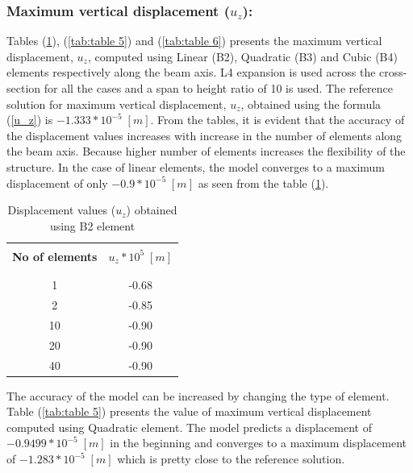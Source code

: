 \documentclass[a4paper,12pt]{article}
\begin{document}
\subsubsection*{Maximum vertical displacement ($u_{z}$):}
Tables (\ref{tab:table 4}), (\ref{tab:table 5}) and (\ref{tab:table 6}) presents the maximum vertical displacement, $u_{z}$, computed using Linear (B2), Quadratic (B3) and Cubic (B4) elements respectively along the beam axis. L4 expansion is used across the cross-section for all the cases and a span to height ratio of 10 is used. The reference solution for maximum vertical displacement, $u_{z}$, obtained using the formula (\ref{u_z}) is $-1.333*10^{-5}\;[m]$. From the tables, it is evident that the accuracy of the displacement values increases with increase in the number of elements along the beam axis. Because higher number of elements increases the flexibility of the structure. In the case of linear elements, the model converges to a maximum displacement of only $-0.9*10^{-5}\;[m]$ as seen from the table (\ref{tab:table 4}).
\begin{table}[h!]
  \begin{center}
     \begin{tabular}{c c}
      \hline\\
      \textbf{No of elements} & \textbf{$u_{z}*10^{5}\;[m]$} \\
      \\
      \hline
      \\[-2pt]
       1 & -0.68 \\[5pt]
       2 & -0.85 \\[5pt]
      10 & -0.90 \\[5pt]
      20 & -0.90 \\[5pt]
      40 & -0.90 \\[5pt]

      \hline
     \end{tabular}
    \caption{Displacement values ($u_{z}$) obtained using B2 element}
    \label{tab:table 4}
  \end{center}
\end{table}
\newpage
The accuracy of the model can be increased by changing the type of element. Table (\ref{tab:table 5}) presents the value of maximum vertical displacement computed using Quadratic element. The model predicts a displacement of $-0.9499*10^{-5}\;[m]$ in the beginning and converges to a maximum displacement of $-1.283*10^{-5}\;[m]$ which is pretty close to the reference solution.
\end{document}

